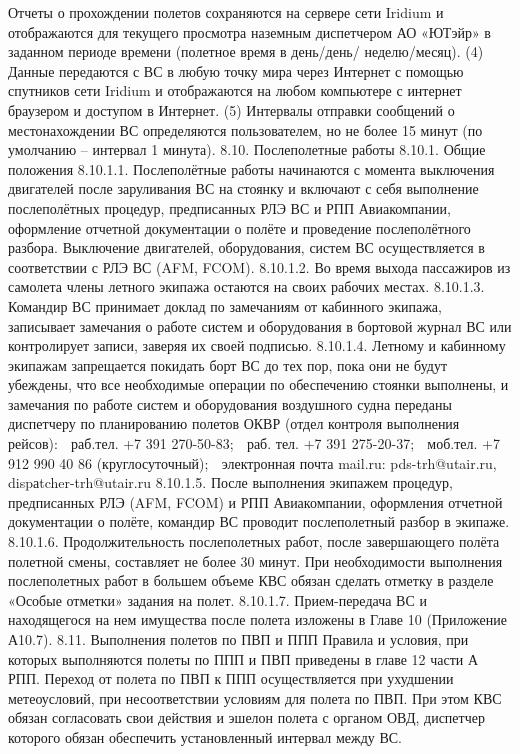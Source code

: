 Отчеты о прохождении полетов сохраняются на сервере сети Iridium и отображаются для текущего
просмотра наземным диспетчером АО «ЮТэйр» в заданном периоде времени (полетное время в день/день/
неделю/месяц).
(4) Данные передаются с ВС в любую точку мира через Интернет с помощью спутников сети Iridium и
отображаются на любом компьютере с интернет браузером и доступом в Интернет.
(5) Интервалы отправки сообщений о местонахождении ВС определяются пользователем, но не более 15
минут (по умолчанию – интервал 1 минута).
8.10.	Послеполетные работы
8.10.1.	Общие положения
8.10.1.1. Послеполётные работы начинаются с момента выключения двигателей после заруливания ВС на стоянку и включают с себя выполнение послеполётных процедур, предписанных РЛЭ ВС и РПП Авиакомпании, оформление отчетной документации о полёте и проведение послеполётного разбора.
Выключение двигателей, оборудования, систем ВС осуществляется в соответствии с РЛЭ ВС (AFM, FCOM).       
8.10.1.2. Во время выхода пассажиров из самолета члены летного экипажа остаются на своих рабочих 
местах.
8.10.1.3. Командир ВС принимает доклад по замечаниям от кабинного экипажа, записывает замечания о работе систем и оборудования в бортовой журнал ВС или контролирует записи, заверяя их своей подписью.
8.10.1.4. Летному и кабинному экипажам запрещается покидать борт ВС до тех пор, пока они не будут убеждены, что все необходимые операции по обеспечению стоянки выполнены, и замечания по работе систем и оборудования воздушного судна переданы диспетчеру по планированию полетов ОКВР (отдел контроля выполнения рейсов):
 раб.тел. +7 391 270-50-83;
 раб. тел. +7 391 275-20-37;
 моб.тел. +7 912 990 40 86 (круглосуточный);
 электронная почта mail.ru: pds-trh@utair.ru, dispаtcher-trh@utair.ru
8.10.1.5. После выполнения экипажем процедур, предписанных РЛЭ (AFM, FCOM) и РПП Авиакомпании, оформления отчетной документации о полёте, командир ВС проводит послеполетный разбор в экипаже.
8.10.1.6. Продолжительность послеполетных работ, после завершающего полёта полетной смены, составляет не более 30 минут. При необходимости выполнения послеполетных работ в большем объеме КВС обязан сделать отметку в разделе «Особые отметки» задания на полет.
8.10.1.7. Прием-передача ВС и находящегося на нем имущества после полета изложены в Главе 10 (Приложение А10.7).
8.11.	Выполнения полетов по ПВП и ППП
Правила и условия, при которых выполняются полеты по ППП и ПВП приведены в главе 12 части А РПП. Переход от полета по ПВП к ППП осуществляется при ухудшении метеоусловий, при несоответствии условиям для полета по ПВП. При этом КВС обязан согласовать свои действия и эшелон полета с органом ОВД, диспетчер которого обязан обеспечить установленный интервал между ВС.
